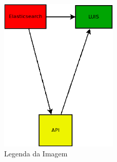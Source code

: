\clearpage

\begin{figure}[!htb]
	\centering
	\includegraphics[width=0.5\textwidth, height=0.35\textheight]{imagens/teste.eps}
	\caption{Legenda da Imagem}
	\label{Label de referência para a imagem}
\end{figure}

